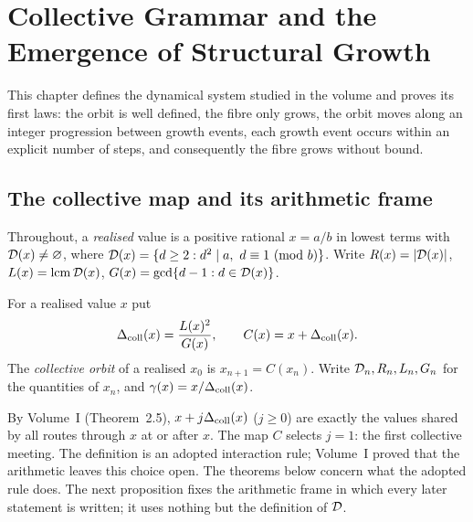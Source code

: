 \chapter{Collective Grammar and the Emergence of Structural Growth}\label{ch:growth}

This chapter defines the dynamical system studied in the volume and proves its first laws: the orbit is well defined, the fibre only grows, the orbit moves along an integer progression between growth events, each growth event occurs within an explicit number of steps, and consequently the fibre grows without bound.

\section{The collective map and its arithmetic frame}

Throughout, a \emph{realised} value is a positive rational \(x=a/b\) in lowest terms with \(\mathcal{D}(x)\ne\varnothing\), where \(\Dx(x)=\{d\ge2: d^2\mid a,\ d\equiv1\ (\mathrm{mod}\ b)\}\). Write \(R(x)=|\mathcal{D}(x)|\), \(L(x)=\operatorname{lcm}\mathcal{D}(x)\), \(G(x)=\gcd\{d-1:d\in\mathcal{D}(x)\}\).

\begin{definition}
For a realised value \(x\) put
\[
\Delta_{\mathrm{coll}}(x)=\frac{L(x)^2}{G(x)},\qquad C(x)=x+\Delta_{\mathrm{coll}}(x).
\]
The \emph{collective orbit} of a realised \(x_0\) is \(x_{n+1}=C(x_n)\). Write \(\mathcal{D}_n,R_n,L_n,G_n\) for the quantities of \(x_n\), and \(\gamma(x)=x/\Delta_{\mathrm{coll}}(x)\).
\end{definition}

By Volume~I (Theorem~2.5), \(x+j\Delta_{\mathrm{coll}}(x)\) (\(j\ge0\)) are exactly the values shared by all routes through \(x\) at or after \(x\). The map \(C\) selects \(j=1\): the first collective meeting. The definition is an adopted interaction rule; Volume~I proved that the arithmetic leaves this choice open. The theorems below concern what the adopted rule does. The next proposition fixes the arithmetic frame in which every later statement is written; it uses nothing but the definition of \(\mathcal{D}\).

